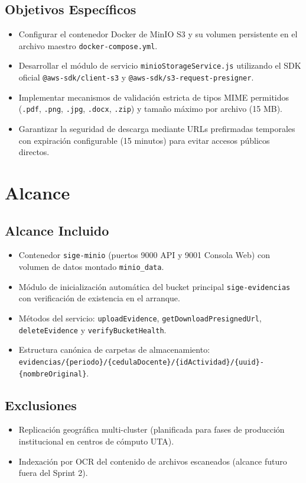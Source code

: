 \documentclass[12pt,a4paper]{article}
\begin{document}
\subsection{Objetivos Específicos}
\begin{itemize}[leftmargin=1.5em, itemsep=1.5pt]
    \item Configurar el contenedor Docker de MinIO S3 y su volumen persistente en el archivo maestro \texttt{docker-compose.yml}.
    \item Desarrollar el módulo de servicio \texttt{minioStorageService.js} utilizando el SDK oficial \texttt{@aws-sdk/client-s3} y \texttt{@aws-sdk/s3-request-presigner}.
    \item Implementar mecanismos de validación estricta de tipos MIME permitidos (\texttt{.pdf}, \texttt{.png}, \texttt{.jpg}, \texttt{.docx}, \texttt{.zip}) y tamaño máximo por archivo (15 MB).
    \item Garantizar la seguridad de descarga mediante URLs prefirmadas temporales con expiración configurable (15 minutos) para evitar accesos públicos directos.
\end{itemize}

\section{Alcance}

\subsection{Alcance Incluido}
\begin{itemize}[leftmargin=1.5em, itemsep=1.5pt]
    \item Contenedor \texttt{sige-minio} (puertos 9000 API y 9001 Consola Web) con volumen de datos montado \texttt{minio\_data}.
    \item Módulo de inicialización automática del bucket principal \texttt{sige-evidencias} con verificación de existencia en el arranque.
    \item Métodos del servicio: \texttt{uploadEvidence}, \texttt{getDownloadPresignedUrl}, \texttt{deleteEvidence} y \texttt{verifyBucketHealth}.
    \item Estructura canónica de carpetas de almacenamiento: \texttt{evidencias/\{periodo\}/\{cedulaDocente\}/\{idActividad\}/\{uuid\}-\{nombreOriginal\}}.
\end{itemize}

\subsection{Exclusiones}
\begin{itemize}[leftmargin=1.5em, itemsep=1.5pt]
    \item Replicación geográfica multi-cluster (planificada para fases de producción institucional en centros de cómputo UTA).
    \item Indexación por OCR del contenido de archivos escaneados (alcance futuro fuera del Sprint 2).
\end{itemize}
\end{document}
